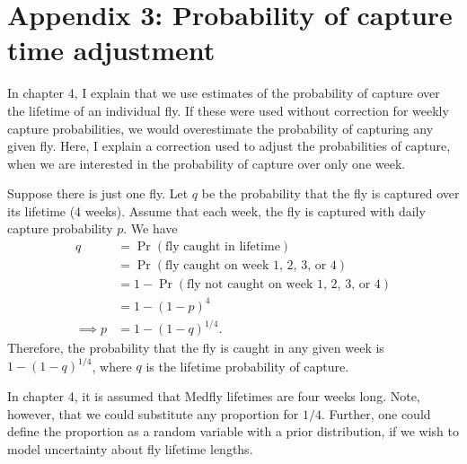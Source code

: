 \documentclass[
  oneside]{book}
\begin{document}
\hypertarget{appendix-3-probability-of-capture-time-adjustment}{%
\section{Appendix 3: Probability of capture time adjustment}\label{appendix-3-probability-of-capture-time-adjustment}}

In chapter 4, I explain that we use estimates of the probability of capture over the lifetime of an individual fly. If these were used without correction for weekly capture probabilities, we would overestimate the probability of capturing any given fly. Here, I explain a correction used to adjust the probabilities of capture, when we are interested in the probability of capture over only one week.

Suppose there is just one fly. Let \(q\) be the probability that the fly is captured over its lifetime (4 weeks). Assume that each week, the fly is captured with daily capture probability \(p\). We have
\[
\begin{aligned}
  q &= \Pr(\text{fly caught in lifetime}) \\
    &= \Pr(\text{fly caught on week 1, 2, 3, or 4}) \\
    &= 1 - \Pr(\text{fly not caught on week 1, 2, 3, or 4}) \\
    &= 1 - (1 - p)^{4} \\
    \implies p &= 1 - (1-q)^{1/4}.
\end{aligned}
\]
Therefore, the probability that the fly is caught in any given week is \(1 - (1 - q)^{1/4}\), where \(q\) is the lifetime probability of capture.

In chapter 4, it is assumed that Medfly lifetimes are four weeks long. Note, however, that we could substitute any proportion for \(1/4\). Further, one could define the proportion as a random variable with a prior distribution, if we wish to model uncertainty about fly lifetime lengths.

\renewcommand{\baselinestretch}{1}\normalsize

  
\end{document}
